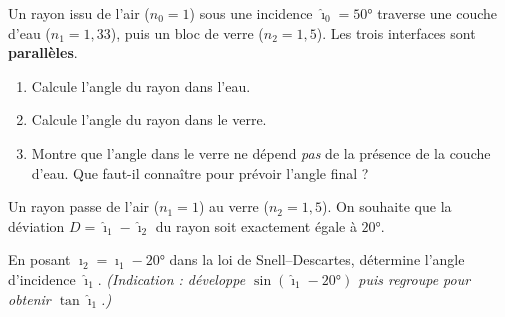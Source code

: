 \documentclass[11pt,a4paper]{article}
\begin{document}
\begin{exo}
Un rayon issu de l'air ($n_0=1$) sous une incidence $\hat{\imath}_0=\ang{50}$ traverse une couche
d'eau ($n_1=1{,}33$), puis un bloc de verre ($n_2=1{,}5$). Les trois interfaces sont \textbf{parallèles}.
\begin{center}
\end{center}
\begin{enumerate}[label=\alph*)]
  \item Calcule l'angle du rayon dans l'eau.
  \item Calcule l'angle du rayon dans le verre.
  \item Montre que l'angle dans le verre ne dépend \emph{pas} de la présence de la couche d'eau.
        Que faut-il connaître pour prévoir l'angle final ?
\end{enumerate}
\end{exo}

\begin{exo}
Un rayon passe de l'air ($n_1=1$) au verre ($n_2=1{,}5$). On souhaite que la déviation
$D=\hat{\imath}_1-\hat{\imath}_2$ du rayon soit exactement égale à $\ang{20}$.

En posant $\hat{\imath}_2=\hat{\imath}_1-\ang{20}$ dans la loi de Snell–Descartes, détermine l'angle
d'incidence $\hat{\imath}_1$. \emph{(Indication : développe $\sin(\hat{\imath}_1-\ang{20})$ puis
regroupe pour obtenir $\tan\hat{\imath}_1$.)}
\end{exo}
\end{document}
